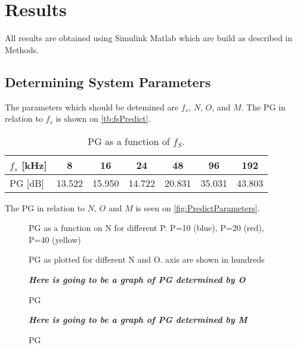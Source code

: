 \section{Results}
All results are obtained using Simulink Matlab which are build as described in Methods. 

\subsection{Determining System Parameters}
The parameters which should be detemined are $f_s$, $N$, $O$, and $M$.         
The PG in relation to $f_s$ is shown on \autoref{tb:fsPredict}.

\begin{table}[H]
\centering
\begin{tabular}{|l|c|c|c|c|c|c|}
\hline
$f_s$ {[}kHz{]} & 8 & 16 & 24 & 48 & 96 & 192 \\ \hline
PG {[}dB{]} & 13.522 & 15.950 & 14.722 & 20.831 & 35.031 & 43.803 \\ \hline
\end{tabular}
\caption{PG as a function of $f_S$.}
\label{tb:fsPredict}
\end{table}


% 	


The PG in relation to $N$, $O$ and $M$ is seen on \autoref{fig:PredictParameters}. 
\begin{figure}[H]
	\centering
	
	\caption{PG as a function on N for different P. P=10 (blue), P=20 (red), P=40 (yellow)}
	\label{fig:PredictN}
\end{figure}

\begin{figure}[H]
	\centering
	
	\caption{PG as plotted for different N and O. axis are shown in hundreds}
	\label{fig:PredictN}
\end{figure}


\begin{figure}[H]
	\centering
	\textbf{\textit{Here is going to be a graph of PG determined by O}}
	\caption{PG }
	\label{fig:PredictO}
\end{figure}
\begin{figure}[H]
	\centering
	\textbf{\textit{Here is going to be a graph of PG determined by M}}
	\caption{PG }
	\label{fig:PredictM}
\end{figure}

